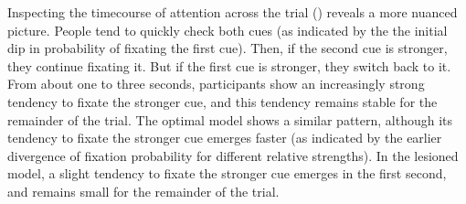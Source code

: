 Inspecting the timecourse of attention across the trial () reveals a more nuanced picture. People tend to quickly check both cues (as indicated by the the initial dip in probability of fixating the first cue). Then, if the second cue is stronger, they continue fixating it. But if the first cue is stronger, they switch back to it. From about one to three seconds, participants show an increasingly strong tendency to fixate the stronger cue, and this tendency remains stable for the remainder of the trial. The optimal model shows a similar pattern, although its tendency to fixate the stronger cue emerges faster (as indicated by the earlier divergence of fixation probability for different relative strengths). In the lesioned model, a slight tendency to fixate the stronger cue emerges in the first second, and remains small for the remainder of the trial.

